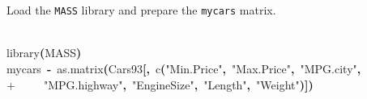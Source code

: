 \documentclass{article}
\newcommand{\hlfunctioncall}[1]{\textcolor[rgb]{1,0,0}{#1}}%
\newcommand{\hlstring}[1]{\textcolor[rgb]{0.6,0.6,1}{#1}}%
\newcommand{\hlkeyword}[1]{\textcolor[rgb]{0,0,0}{\textbf{#1}}}%
\newcommand{\hlassignement}[1]{\textcolor[rgb]{0.215686274509804,0.215686274509804,0.384313725490196}{\textbf{#1}}}%
\newcommand{\hlsymbol}[1]{\textcolor[rgb]{0,0,0}{#1}}%
\newcommand{\hlprompt}[1]{\textcolor[rgb]{0,0,0}{#1}}%
\newcommand{\hlstd}[1]{\textcolor[rgb]{0,0,0}{#1}}%
\newenvironment{Houtput}{\raggedright}{%
%
}
\begin{document}
    \section{}
    Load the \verb=MASS= library and prepare the \verb=mycars= matrix.
\begin{Houtput}
\hspace*{\fill}\\
\hlstd{}\ttfamily\noindent
\hlprompt{\usebox{\hlnormalsizeboxgreaterthan}{\ }}\hlfunctioncall{library}\hlkeyword{(}\hlsymbol{MASS}\hlkeyword{)}\mbox{}
\normalfont
\hspace*{\fill}\\
\hlstd{}\ttfamily\noindent
\hlprompt{\usebox{\hlnormalsizeboxgreaterthan}{\ }}\hlsymbol{mycars}{\ }\hlassignement{\usebox{\hlnormalsizeboxlessthan}-}{\ }\hlfunctioncall{as.matrix}\hlkeyword{(}\hlsymbol{Cars93}\hlkeyword{[}\hlkeyword{,}{\ }\hlfunctioncall{c}\hlkeyword{(}\hlstring{"Min.Price"}\hlkeyword{,}{\ }\hlstring{"Max.Price"}\hlkeyword{,}{\ }\hlstring{"MPG.city"}\hlkeyword{,}\hspace*{\fill}\\
\hlstd{}\hlprompt{+{\ }}{\ }{\ }{\ }{\ }\hlstring{"MPG.highway"}\hlkeyword{,}{\ }\hlstring{"EngineSize"}\hlkeyword{,}{\ }\hlstring{"Length"}\hlkeyword{,}{\ }\hlstring{"Weight"}\hlkeyword{)}\hlkeyword{]}\hlkeyword{)}\mbox{}
\normalfont
\hspace*{\fill}\\
\hlstd{}
\end{Houtput}
\end{document}
